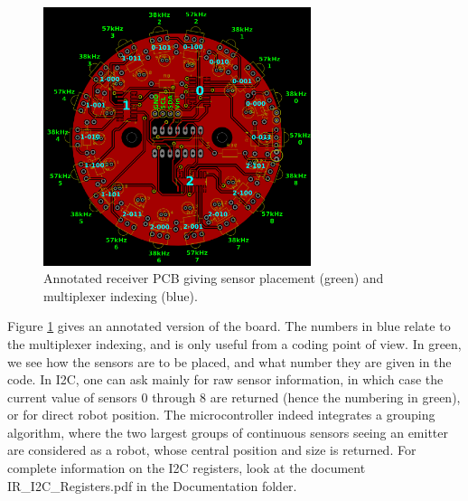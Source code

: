 \documentclass[a4paper,11pt]{article}
\begin{document}
\begin{figure}[h]
  \centering
  \includegraphics[width=0.7\textwidth]{Figures/IC_Documentation_Receiver.pdf}
  \caption{Annotated receiver PCB giving sensor placement (green) and multiplexer indexing (blue).}
  \label{fReceiverDoc}
\end{figure}

Figure \ref{fReceiverDoc} gives an annotated version of the board. The numbers in blue relate to the multiplexer indexing, and is only useful from a coding point of view. In green, we see how the sensors are to be placed, and what number they are given in the code. In I2C, one can ask mainly for raw sensor information, in which case the current value of sensors 0 through 8 are returned (hence the numbering in green), or for direct robot position. The microcontroller indeed integrates a grouping algorithm, where the two largest groups of continuous sensors seeing an emitter are considered as a robot, whose central position and size is returned. For complete information on the I2C registers, look at the document IR\_I2C\_Registers.pdf in the Documentation folder.
\end{document}
